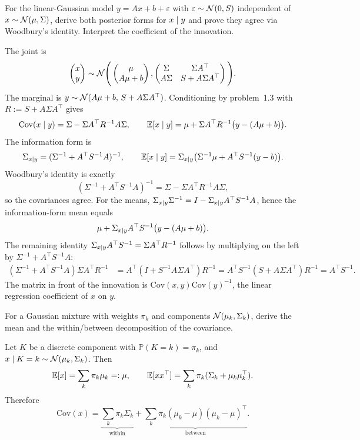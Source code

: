 \begin{hwqbox}
For the linear-Gaussian model $y=Ax+b+\varepsilon$ with $\varepsilon\sim\mathcal{N}(0,S)$ independent of $x\sim\mathcal{N}(\mu,\Sigma)$, derive both posterior forms for $x\mid y$ and prove they agree via Woodbury's identity. Interpret the coefficient of the innovation.
\end{hwqbox}
\begin{hwsolbox}
The joint is
\[
\begin{pmatrix}x\\ y\end{pmatrix}
\sim\mathcal{N}\Bigg(
\begin{pmatrix}\mu\\ A\mu+b\end{pmatrix},
\begin{pmatrix}\Sigma & \Sigma A^\top\\ A\Sigma & S+A\Sigma A^\top\end{pmatrix}
\Bigg).
\]
The marginal is $y\sim\mathcal{N}(A\mu+b,\,S+A\Sigma A^\top)$. Conditioning by problem~1.3 with $R:=S+A\Sigma A^\top$ gives
\[
\mathrm{Cov}(x\mid y)=\Sigma-\Sigma A^\top R^{-1}A\Sigma,\qquad
\mathbb{E}[x\mid y]=\mu+\Sigma A^\top R^{-1}\bigl(y-(A\mu+b)\bigr).
\]
The information form is
\[
\Sigma_{x\mid y}=(\Sigma^{-1}+A^\top S^{-1}A)^{-1},\qquad
\mathbb{E}[x\mid y]=\Sigma_{x\mid y}\bigl(\Sigma^{-1}\mu+A^\top S^{-1}(y-b)\bigr).
\]
Woodbury's identity is exactly
\[
(\Sigma^{-1}+A^\top S^{-1}A)^{-1}=\Sigma-\Sigma A^\top R^{-1}A\Sigma,
\]
so the covariances agree. For the means, $\Sigma_{x\mid y}\Sigma^{-1}=I-\Sigma_{x\mid y}A^\top S^{-1}A$, hence the information-form mean equals
\[
\mu+\Sigma_{x\mid y}A^\top S^{-1}\bigl(y-(A\mu+b)\bigr).
\]
The remaining identity $\Sigma_{x\mid y}A^\top S^{-1}=\Sigma A^\top R^{-1}$ follows by multiplying on the left by $\Sigma^{-1}+A^\top S^{-1}A$:
\begin{align*}
(\Sigma^{-1}+A^\top S^{-1}A)\Sigma A^\top R^{-1}
&=A^\top(I+S^{-1}A\Sigma A^\top)R^{-1}
=A^\top S^{-1}(S+A\Sigma A^\top)R^{-1}
=A^\top S^{-1}.
\end{align*}
The matrix in front of the innovation is $\mathrm{Cov}(x,y)\mathrm{Cov}(y)^{-1}$, the linear regression coefficient of $x$ on $y$.
\end{hwsolbox}

\begin{hwqbox}
For a Gaussian mixture with weights $\pi_k$ and components $\mathcal{N}(\mu_k,\Sigma_k)$, derive the mean and the within/between decomposition of the covariance.
\end{hwqbox}
\begin{hwsolbox}
Let $K$ be a discrete component with $\mathbb P(K=k)=\pi_k$, and $x\mid K=k\sim\mathcal{N}(\mu_k,\Sigma_k)$. Then
\[
\mathbb{E}[x]=\sum_k\pi_k\mu_k=:\mu,\qquad
\mathbb{E}[xx^\top]=\sum_k\pi_k(\Sigma_k+\mu_k\mu_k^\top).
\]
Therefore
\[
\mathrm{Cov}(x)
=\underbrace{\sum_k\pi_k\Sigma_k}_{\text{within}}
+\underbrace{\sum_k\pi_k(\mu_k-\mu)(\mu_k-\mu)^\top}_{\text{between}}.
\]
\end{hwsolbox}

